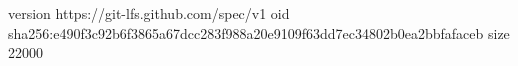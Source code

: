 version https://git-lfs.github.com/spec/v1
oid sha256:e490f3c92b6f3865a67dcc283f988a20e9109f63dd7ec34802b0ea2bbfafaceb
size 22000
